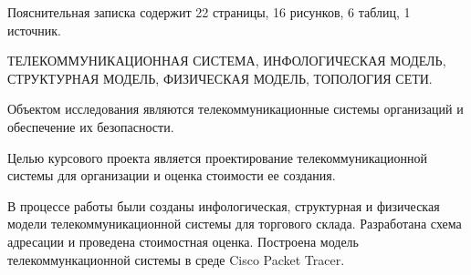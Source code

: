 
Пояснительная записка содержит 22 страницы, 16 рисунков, 6 таблиц, 1 источник.

ТЕЛЕКОММУНИКАЦИОННАЯ СИСТЕМА, ИНФОЛОГИЧЕСКАЯ МОДЕЛЬ, СТРУКТУРНАЯ МОДЕЛЬ, ФИЗИЧЕСКАЯ МОДЕЛЬ, ТОПОЛОГИЯ СЕТИ.

Объектом исследования являются телекоммуникационные системы организаций и обеспечение их безопасности.

Целью курсового проекта является проектирование телекоммуникационной системы для организации и оценка стоимости ее создания. 

В процессе работы были созданы инфологическая, структурная и физическая модели телекоммуникационной системы для торгового склада. Разработана схема адресации и проведена стоимостная оценка. Построена модель телекоммункационной системы в среде Cisco Packet Tracer.
